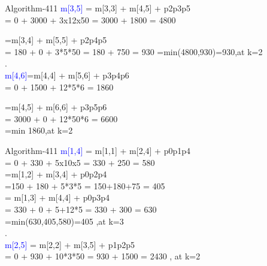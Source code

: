 \documentclass{beamer}
\begin{document}
\begin{frame}[t]{Algorithm-411}
\vspace{15 pt}
\textcolor{blue}{m[3,5]} =  m[3,3] + m[4,5] + p2p3p5\\ = 0 + 3000 + 3x12x50 = 3000 + 1800 = 4800  

=m[3,4] + m[5,5] + p2p4p5\\ = 180 + 0 + 3*5*50 = 180 + 750 = 930  
=min(4800,930)=930,at k=2 \\.\\

\textcolor{blue}{m[4,6]}=m[4,4] + m[5,6] + p3p4p6\\ = 0 + 1500 + 12*5*6 =  1860  

=m[4,5] + m[6,6] + p3p5p6\\ = 3000 + 0 +  12*50*6   = 6600\\  
=min 1860,at k=2 
\end{frame}

\begin{frame}[t]{Algorithm-411}
\vspace{15 pt}
\textcolor{blue}{m[1,4]} =  m[1,1] + m[2,4] + p0p1p4 \\ = 0 + 330 + 5x10x5 = 330 + 250 = 580\\
 =m[1,2] + m[3,4] + p0p2p4\\ =150 + 180 + 5*3*5 = 150+180+75 = 405  \\

   =  m[1,3] + m[4,4] + p0p3p4  \\ = 330 + 0 + 5+12*5 = 330 + 300 = 630\\
   =min(630,405,580)=405 ,at k=3\\.\\
   
\textcolor{blue}{ m[2,5]} =  m[2,2] + m[3,5] + p1p2p5\\ =   0 + 930 + 10*3*50 = 930 + 1500 = 2430 , at k=2  

\end{frame}
\end{document}
